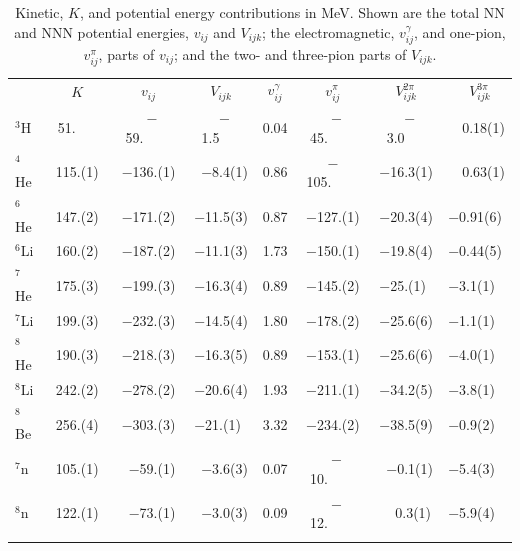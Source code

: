 \begin{table}
\caption{Kinetic, $K$, and potential energy contributions in MeV. Shown are
the total NN and NNN potential energies, $v_{ij}$ and $V_{ijk}$;
the electromagnetic, $v^{\gamma}_{ij}$, and one-pion, $v^{\pi}_{ij}$, parts of 
$v_{ij}$; and the two- and three-pion parts of $V_{ijk}$.}
\label{tab:gfmc}
\begin{tabular}{lccccccl}
\toprule
       & $K$      & $v_{ij}$    & $V_{ijk}$ & $v^{\gamma}_{ij}$ 
                                                    & $v^{\pi}_{ij}$ & $V^{2\pi}_{ijk}$ 
                                                                             & ~~~$V^{3\pi}_{ijk}$ \\
\colrule                                            
$^3$H  & ~51.~~~~ & ~$-$59.~~~~ & ~$-$1.5~~~ & 0.04 & ~$-$45.~~~~ & ~$-$3.0~~~ &  ~~0.18(1) \\
$^4$He & 115.(1)  & $-$136.(1)  & ~$-$8.4(1) & 0.86 & $-$105.~~~~ & $-$16.3(1) &  ~~0.63(1)  \\
$^6$He & 147.(2)  & $-$171.(2)  & $-$11.5(3) & 0.87 & $-$127.(1)  & $-$20.3(4) & $-$0.91(6) \\
$^6$Li & 160.(2)  & $-$187.(2)  & $-$11.1(3) & 1.73 & $-$150.(1)  & $-$19.8(4) & $-$0.44(5) \\
$^7$He & 175.(3)  & $-$199.(3)  & $-$16.3(4) & 0.89 & $-$145.(2)  & $-$25.(1)~ & $-$3.1(1) \\
$^7$Li & 199.(3)  & $-$232.(3)  & $-$14.5(4) & 1.80 & $-$178.(2)  & $-$25.6(6) & $-$1.1(1) \\
$^8$He & 190.(3)  & $-$218.(3)  & $-$16.3(5) & 0.89 & $-$153.(1)  & $-$25.6(6) & $-$4.0(1) \\
$^8$Li & 242.(2)  & $-$278.(2)  & $-$20.6(4) & 1.93 & $-$211.(1)  & $-$34.2(5) & $-$3.8(1) \\
$^8$Be & 256.(4)  & $-$303.(3)  & $-$21.(1)~ & 3.32 & $-$234.(2)  & $-$38.5(9) & $-$0.9(2) \\
\colrule                                                                                     
$^7$n  & 105.(1)  & ~$-$59.(1)  & ~$-$3.6(3) & 0.07 & ~$-$10.~~~~ & ~$-$0.1(1) & $-$5.4(3) \\
$^8$n  & 122.(1)  & ~$-$73.(1)  & ~$-$3.0(3) & 0.09 & ~$-$12.~~~~ &   ~~0.3(1) & $-$5.9(4) \\
\botrule
\end{tabular}
\end{table}

